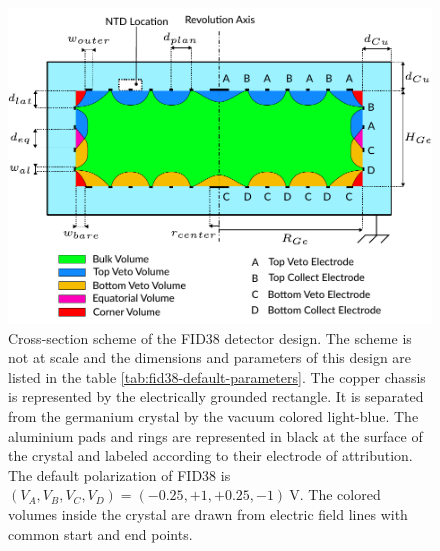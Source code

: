\begin{figure}
\centering
\includegraphics[scale=1]{Figures/Electrodes/scheme_fid38.pdf}
\caption{
Cross-section scheme of the FID38 detector design. The scheme is not at scale and the dimensions and parameters of this design are listed in the table \ref{tab:fid38-default-parameters}. The copper chassis is represented by the electrically grounded rectangle. It is separated from the germanium crystal by the vacuum colored light-blue. The aluminium pads and rings are represented in black at the surface of the crystal and labeled according to their electrode of attribution. The default polarization of FID38 is $(V_A, V_B, V_C, V_D) = (-0.25, +1, +0.25,  -1) \ \si{\volt}$. The colored volumes inside the crystal are drawn from electric field lines with common start and end points.
}
\label{fig:fid38-scheme}
\end{figure}

